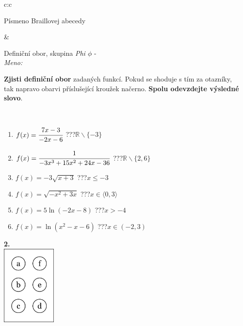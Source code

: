 \documentclass[10pt]{report}
\begin{document}
\begin{tabular}{c:c}
\begin{minipage}[c][104.5mm][t]{0.5\linewidth}
\begin{center}
\begin{minipage}{0.20\linewidth}
\begin{center}
{\small Písmeno Braillovej abecedy}
\end{center}
\end{minipage}
\end{center}
\end{minipage}
&
\begin{minipage}[c][104.5mm][t]{0.5\linewidth}
\begin{center}
\vspace{7mm}
{\huge Definiční obor, skupina \textit{Phi $\phi$} -}\\[5mm]
\textit{Meno:}\phantom{xxxxxxxxxxxxxxxxxxxxxxxxxxxxxxxxxxxxxxxxxxxxxxxxxxxxxxxxxxxxxxxxx}\\[5mm]
\begin{minipage}{0.95\linewidth}
\textbf{Zjisti definiční obor} zadaných funkcí. Pokud se shoduje s tím za otazníky,\\tak napravo obarvi příslušející kroužek načerno. \textbf{Spolu odevzdejte výsledné slovo}.
\end{minipage}
\\[1mm]
\begin{minipage}{0.79\linewidth}
\begin{center}
\begin{varwidth}{\linewidth}
\begin{enumerate}
\normalsizerrr
\item $f(x)=\cfrac{7x-3}{-2x-6}$\quad \dotfill\; ???\;\dotfill \quad $\mathbb{R}\smallsetminus\{-3\}$
\item $f(x)=\cfrac{1}{-3x^3+15x^2+24x-36}$\quad \dotfill\; ???\;\dotfill \quad $\mathbb{R}\smallsetminus\{2,6\}$
\item $f(x)=-3\sqrt{x+3}$\quad \dotfill\; ???\;\dotfill \quad $x\leq-3$
\item $f(x)=\sqrt{-x^2+3x}$\quad \dotfill\; ???\;\dotfill \quad $x\in\langle0 , 3\rangle$
\item $f(x)=5\ln{(-2x-8)}$\quad \dotfill\; ???\;\dotfill \quad $x>-4$
\item $f(x)=\ln{(x^2-x-6)}$\quad \dotfill\; ???\;\dotfill \quad $x\in(-2 , 3)$
\end{enumerate}
\end{varwidth}
\end{center}
\end{minipage}
\begin{minipage}{0.20\linewidth}
\begin{center}
{\Huge\bfseries 2.} \\[2mm]
\includegraphics[height=40mm]{../images/braille.png}

\end{center}
\end{minipage}
\end{center}
\end{minipage}
\end{tabular}
\end{document}
